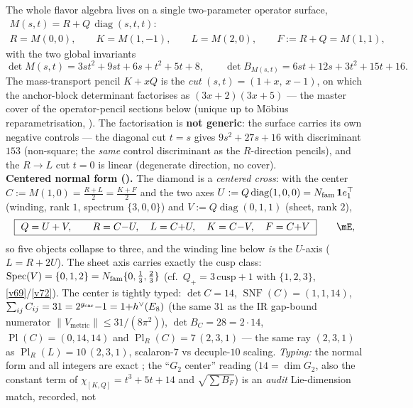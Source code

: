 
\begin{winbox}
The whole flavor algebra lives on a single two-parameter operator surface,
\[
\begin{gathered}
  M(s,t)=R+Q\,\operatorname{diag}(s,t,t):\\
  R=M(0,0),\qquad K=M(1,-1),\qquad L=M(2,0),\qquad F:=R{+}Q=M(1,1),
\end{gathered}
\]
with the two global invariants
\[
  \det M(s,t)=3st^2+9st+6s+t^2+5t+8,\qquad
  \det B_{M(s,t)}=6st+12s+3t^2+15t+16 .
\]
The mass-transport pencil $K+xQ$ is the \emph{cut} $(s,t)=(1{+}x,\,x{-}1)$, on which the anchor-block
determinant factorises as $(3x{+}2)(3x{+}5)$ --- the master cover of the operator-pencil sections below
(unique up to M\"obius reparametrisation, ). The
factorisation is \textbf{not generic}: the surface carries its own negative controls --- the diagonal cut
$t{=}s$ gives $9s^2{+}27s{+}16$ with discriminant $153$ (non-square; the \emph{same} control discriminant as
the $R$-direction pencils), and the $R{\to}L$ cut $t{=}0$ is linear (degenerate direction, no cover).
\smallskip\\
\noindent\textbf{Centered normal form ().} The diamond is a \emph{centered
cross}: with the center $C:=M(1,0)=\tfrac{R+L}{2}=\tfrac{K+F}{2}$ and the two axes
$U:=Q\operatorname{diag}(1,0,0)=N_{\mathrm{fam}}\,\mathbf1e_1^\top$ (winding, rank $1$, spectrum $\{3,0,0\}$) and
$V:=Q\operatorname{diag}(0,1,1)$ (sheet, rank $2$),
\[
  \boxed{\ Q=U+V,\qquad R=C{-}U,\quad L=C{+}U,\quad K=C{-}V,\quad F=C{+}V\ }\qquad\mE ,
\]
so five objects collapse to three, and the winding line below \emph{is} the $U$-axis ($L=R+2U$). The sheet
axis carries exactly the cusp class: $\operatorname{Spec}(V)=\{0,1,2\}=N_{\mathrm{fam}}\{0,\tfrac13,\tfrac23\}$
(cf.\ $Q_+=3\,\mathrm{cusp}+1$ with $\{1,2,3\}$, \vref{v69}/\vref{v72}). The center is tightly typed:
$\det C=14$, $\operatorname{SNF}(C)=(1,1,14)$, $\sum_{ij}C_{ij}=31=2^{g_{\mathrm{car}}}{-}1=1{+}h^\vee(E_8)$ (the same
$31$ as the IR gap-bound numerator $\|V_{\mathrm{metric}}\|\le31/(8\pi^2)$), $\det B_C=28=2\cdot14$,
$\operatorname{Pl}(C)=(0,14,14)$ and $\operatorname{Pl}_R(C)=7\,(2,3,1)$ --- the same ray $(2,3,1)$ as
$\operatorname{Pl}_R(L)=10\,(2,3,1)$, scalaron-$7$ vs decuple-$10$ scaling. \emph{Typing:} the normal form
and all integers are exact \mE; the ``$G_2$ center'' reading ($14=\dim G_2$, also the constant term of
$\chi_{[K,Q]}=t^3{+}5t{+}14$ and $\sqrt{\sum B_F}$) is an \emph{audit} Lie-dimension match, recorded, not

\end{winbox}
